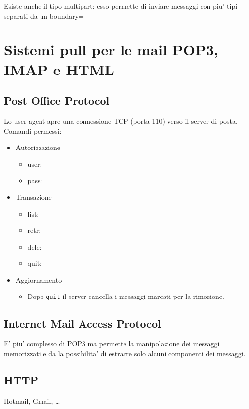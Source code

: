 Esiste anche il tipo multipart: esso permette di inviare messaggi con piu' tipi separati da un {\color{blue}boundary=}

\section{Sistemi pull per le mail POP3, IMAP e HTML}
\subsection{Post Office Protocol}
Lo user-agent apre una connessione TCP (porta 110) verso il server di posta. Comandi permessi:
\begin{itemize}
    \item Autorizzazione
    \begin{itemize}
        \item user:
        \item pass:
    \end{itemize}
    \item Transazione
    \begin{itemize}
        \item list:
        \item retr:
        \item dele:
        \item quit:
    \end{itemize}
    \item Aggiornamento
    \begin{itemize}
        \item Dopo \texttt{quit} il server cancella i messaggi marcati per la rimozione.
    \end{itemize}
\end{itemize}
\subsection{Internet Mail Access Protocol}
E' piu' complesso di POP3 ma permette la manipolazione dei messaggi memorizzati e da la possibilita' di estrarre solo alcuni componenti dei messaggi.
\subsection{HTTP}
Hotmail, Gmail, \dots